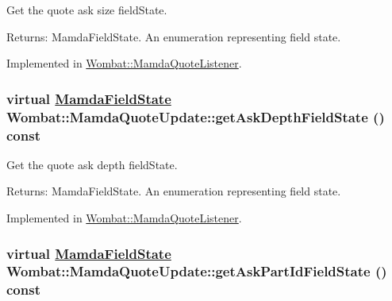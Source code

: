 Get the quote ask size field\-State. 

\begin{Desc}
\item[Returns:]Mamda\-Field\-State. An enumeration representing field state. \end{Desc}


Implemented in \hyperlink{classWombat_1_1MamdaQuoteListener_4e3d063324f15dacfaf2eec0f7f31e71}{Wombat::Mamda\-Quote\-Listener}.\hypertarget{classWombat_1_1MamdaQuoteUpdate_dac0e970dfba6fa7092bdbb6a0964845}{
\subsubsection[getAskDepthFieldState]{\setlength{\rightskip}{0pt plus 5cm}virtual \hyperlink{namespaceWombat_93aac974f2ab713554fd12a1fa3b7d2a}{Mamda\-Field\-State} Wombat::Mamda\-Quote\-Update::get\-Ask\-Depth\-Field\-State () const}}
\label{classWombat_1_1MamdaQuoteUpdate_dac0e970dfba6fa7092bdbb6a0964845}


Get the quote ask depth field\-State. 

\begin{Desc}
\item[Returns:]Mamda\-Field\-State. An enumeration representing field state. \end{Desc}


Implemented in \hyperlink{classWombat_1_1MamdaQuoteListener_f43a394a5e090162a80b749f682ecc38}{Wombat::Mamda\-Quote\-Listener}.\hypertarget{classWombat_1_1MamdaQuoteUpdate_311d02bb864e1b67e106db7f6dfbd362}{
\subsubsection[getAskPartIdFieldState]{\setlength{\rightskip}{0pt plus 5cm}virtual \hyperlink{namespaceWombat_93aac974f2ab713554fd12a1fa3b7d2a}{Mamda\-Field\-State} Wombat::Mamda\-Quote\-Update::get\-Ask\-Part\-Id\-Field\-State () const}}
\label{classWombat_1_1MamdaQuoteUpdate_311d02bb864e1b67e106db7f6dfbd362}



